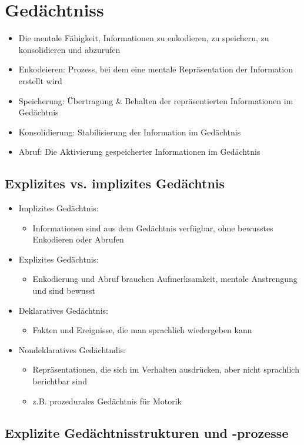 \section{Gedächtniss}
\begin{itemize}
	\item Die mentale Fähigkeit, Informationen zu enkodieren, zu speichern, zu konsolidieren und abzurufen 
	\item Enkodeieren: Prozess, bei dem eine mentale Repräsentation der Information erstellt wird
	\item Speicherung: Übertragung \& Behalten der repräsentierten Informationen im Gedächtnis
	\item Konsolidierung: Stabilisierung der Information im Gedächtnis
	\item Abruf: Die Aktivierung gespeicherter Informationen im Gedächtnis 
\end{itemize}
\subsection{Explizites vs. implizites Gedächtnis}
\begin{itemize}
	\item Implizites Gedächtnis:
		\begin{itemize}
			\item Informationen sind aus dem Gedächtnis verfügbar, ohne bewusstes Enkodieren oder Abrufen
		\end{itemize}
	\item Explizites Gedächtnis: 
		\begin{itemize}
			\item Enkodierung und Abruf brauchen Aufmerksamkeit, mentale Anstrengung und sind bewusst
		\end{itemize}
	\item Deklaratives Gedächtnis:
		\begin{itemize}
			\item Fakten und Ereignisse, die man sprachlich wiedergeben kann
		\end{itemize}
	\item Nondeklaratives Gedächtndis:
		\begin{itemize}
			\item Repräsentationen, die sich im Verhalten ausdrücken, aber nicht sprachlich berichtbar sind
			\item z.B. prozedurales Gedächtnis für Motorik
		\end{itemize}
\end{itemize}
\subsection{Explizite Gedächtnisstrukturen und -prozesse}
